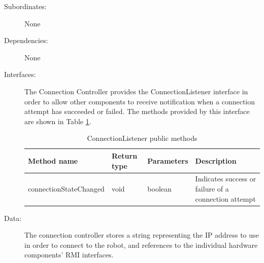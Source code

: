 \documentclass[12pt]{article}
\begin{document}
\begin{description}
\item[{Subordinates: }] None
\item[{Dependencies: }] None

\item[{Interfaces: }] The Connection Controller provides the ConnectionListener interface in order to allow other components to receive notification when a connection attempt has succeeded or failed. The methods provided by this interface are shown in Table \ref{table:connectionlistener}.

\begin{table}
\begin{tabular}{ | p{} | p{} |p{}|p{}|}
\hline
\textbf{Method name} & \textbf{Return type} & \textbf{Parameters} & \textbf{Description} \\
\hline
connectionStateChanged & void & boolean & Indicates success or failure of a connection attempt \\
\hline
\end{tabular}
\caption{ConnectionListener public methods}
\label{table:connectionlistener}
\end{table}

\item[{Data: }] The connection controller stores a string representing the IP address to use in order to connect to the robot, and references to the individual hardware components' RMI interfaces.
\end{description}
\FloatBarrier
\end{document}
